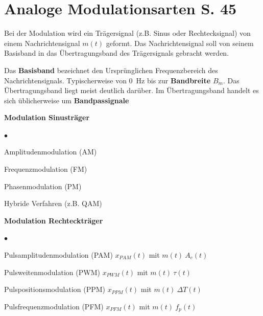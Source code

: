 \section{Analoge Modulationsarten S. 45}
Bei der Modulation wird ein Trägersignal (z.B. Sinus oder Rechtecksignal) von einem Nachrichtensignal $m(t)$ geformt. Das Nachrichtensignal soll von seinem Basisband in das Übertragungsband des Trägersignals gebracht werden.

Das \textbf{Basisband} bezeichnet den Ursprünglichen Frequenzbereich des Nachrichtensignals. Typischerweise von \qty{0}{\Hz} bis zur \textbf{Bandbreite} $B_m$. Das Übertragungsband liegt meist deutlich darüber. Im Übertragungsband handelt es sich üblicherweise um \textbf{Bandpassignale}

\begin{minipage}{.4\textwidth}
	\textbf{Modulation Sinusträger}
	
	\begin{list}{$\bullet$}{\setlength{\itemsep}{0cm} \setlength{\parsep}{0cm} \setlength{\topsep}{0cm}} 
	\item Amplitudenmodulation (AM)
	\item Frequenzmodulation (FM)
	\item Phasenmodulation (PM)
	\item Hybride Verfahren (z.B. QAM)
	\end{list}
\end{minipage}
\begin{minipage}{.6\textwidth}
	\textbf{Modulation Rechteckträger}
	
	\begin{list}{$\bullet$}{\setlength{\itemsep}{0cm} \setlength{\parsep}{0cm} \setlength{\topsep}{0cm}} 
		\item Pulsamplitudenmodulation (PAM) $x_{PAM}(t)$ mit $m(t)~A_c(t)$
		\item Pulsweitenmodulation (PWM) $x_{PWM}(t)$ mit $m(t) ~\tau(t)$
		\item Pulspositionsmodulation (PPM) $x_{PPM}(t)$ mit $m(t) ~ \Delta T(t)$
		\item Pulsfrequenzmodulation (PFM) $x_{PFM}(t)$ mit $m(t)~f_p(t)$
	\end{list}
\end{minipage}



\newpage